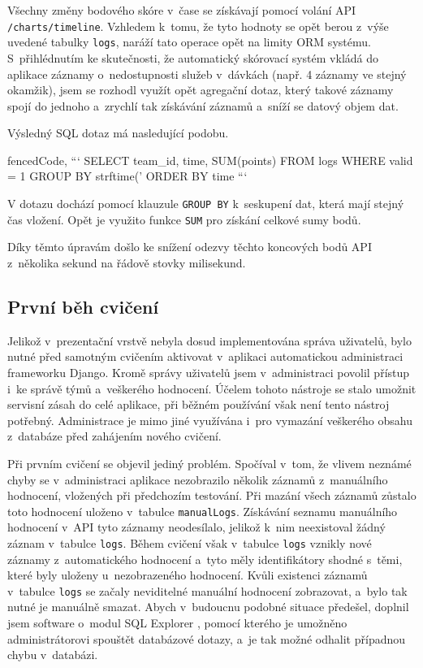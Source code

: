 \documentclass[
  digital,
  twoside,
  table, 
  nolof, 
  nolot
]{fithesis3}
\begin{document}
Všechny změny bodového skóre v~čase se získávají pomocí volání API \texttt{/charts/timeline}. Vzhledem k~tomu, že tyto hodnoty se opět berou z~výše uvedené tabulky \texttt{logs}, naráží tato operace opět na limity ORM systému. S~přihlédnutím ke skutečnosti, že automatický skórovací systém vkládá do aplikace záznamy o~nedostupnosti služeb v~dávkách (např. 4 záznamy ve stejný okamžik), jsem se rozhodl využít opět agregační dotaz, který takové záznamy spojí do jednoho a~zrychlí tak získávání záznamů a~sníží se datový objem dat.

\noindent
Výsledný SQL dotaz má nasledující podobu.

\begin{markdown*}{%
  fencedCode,
}
```
SELECT team_id, time, SUM(points) FROM logs 
WHERE valid = 1 
GROUP BY strftime('%
ORDER BY time
```
\end{markdown*}

V dotazu dochází pomocí klauzule \texttt{GROUP\ BY} k~seskupení dat, která mají stejný čas vložení. Opět je využito funkce \texttt{SUM} pro získání celkové sumy bodů.

Díky těmto úpravám došlo ke snížení odezvy těchto koncových bodů API z~několika sekund na řádově stovky milisekund. 

\subsection{První běh cvičení}

Jelikož v~prezentační vrstvě nebyla dosud implementována správa uživatelů, bylo nutné před samotným cvičením aktivovat v~aplikaci automatickou administraci frameworku Django. Kromě správy uživatelů jsem v~administraci povolil přístup i~ke správě týmů a~veškerého hodnocení. Účelem tohoto nástroje se stalo umožnit servisní zásah do celé aplikace, při běžném používání však není tento nástroj potřebný. Administrace je mimo jiné využívána i~pro vymazání veškerého obsahu z~databáze před zahájením nového cvičení.

Při prvním cvičení se objevil jediný problém. Spočíval v~tom, že vlivem neznámé chyby se v~administraci aplikace nezobrazilo několik záznamů z~manuálního hodnocení, vložených při předchozím testování. Při mazání všech záznamů zůstalo toto hodnocení uloženo v~tabulce \texttt{manualLogs}. Získávání seznamu manuálního hodnocení v~API tyto záznamy neodesílalo, jelikož k~nim neexistoval žádný záznam v~tabulce \texttt{logs}. Během cvičení však v~tabulce \texttt{logs} vznikly nové záznamy z~automatického hodnocení a~tyto měly identifikátory shodné s~těmi, které byly uloženy u~nezobrazeného hodnocení. Kvůli existenci záznamů v~tabulce \texttt{logs} se začaly neviditelné manuální hodnocení zobrazovat, a~bylo tak nutné je manuálně smazat. Abych v~budoucnu podobné situace předešel, doplnil jsem software o~modul SQL Explorer \cite{sqlexplorer}, pomocí kterého je umožněno administrátorovi spouštět databázové dotazy, a~je tak možné odhalit případnou chybu v~databázi.
\end{document}
